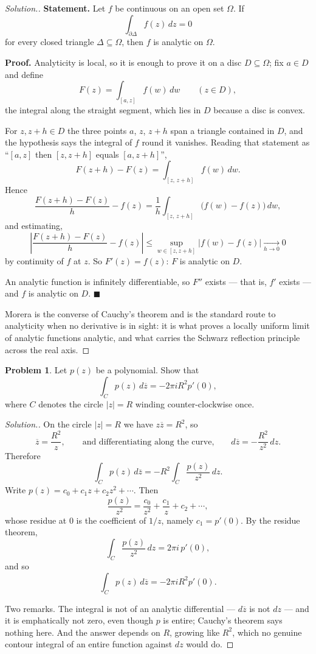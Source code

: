 \documentclass[11pt,a4paper]{article}
\theoremstyle{definition}
\newtheorem{problemx}{Problem}[section]
\newenvironment{problem}{\begin{problemx}}{\end{problemx}}
\newenvironment{solution}
  {\renewcommand{\qedsymbol}{}\begin{proof}[\textit{Solution}.]}
  {\end{proof}}
\begin{document}
\begin{solution}
\textbf{Statement.} Let $f$ be continuous on an open set $\Omega$. If
$$\int_{\partial \Delta} f(z)\,dz = 0$$
for every closed triangle $\Delta \subseteq \Omega$, then $f$ is analytic on
$\Omega$.

\textbf{Proof.} Analyticity is local, so it is enough to prove it on a disc
$D \subseteq \Omega$; fix $a \in D$ and define
$$F(z) = \int_{[a,z]} f(w)\,dw \qquad (z \in D),$$
the integral along the straight segment, which lies in $D$ because a disc is
convex.

For $z, z+h \in D$ the three points $a$, $z$, $z+h$ span a triangle contained in
$D$, and the hypothesis says the integral of $f$ round it vanishes. Reading that
statement as ``$[a,z]$ then $[z,z+h]$ equals $[a,z+h]$'',
$$F(z+h) - F(z) = \int_{[z,\,z+h]} f(w)\,dw .$$
Hence
$$\frac{F(z+h)-F(z)}{h} - f(z)
= \frac{1}{h}\int_{[z,\,z+h]}\big(f(w) - f(z)\big)\,dw,$$
and estimating,
$$\left|\frac{F(z+h)-F(z)}{h} - f(z)\right|
\leq \sup_{w \in [z,z+h]}\left|f(w)-f(z)\right| \xrightarrow[h \to 0]{} 0$$
by continuity of $f$ at $z$. So $F'(z) = f(z)$: $F$ is analytic on $D$.

An analytic function is infinitely differentiable, so $F'' $ exists --- that is,
$f' $ exists --- and $f$ is analytic on $D$. $\blacksquare$

Morera is the converse of Cauchy's theorem and is the standard route to
analyticity when no derivative is in sight: it is what proves a locally uniform
limit of analytic functions analytic, and what carries the Schwarz reflection
principle across the real axis.
\end{solution}


\begin{problem}
Let $p(z)$ be a polynomial. Show that
$$\int_{C} p(z)\,d\overline{z} = -2\pi i R^{2}p'(0),$$
where $C$ denotes the circle $\left|z\right| = R$ winding counter-clockwise
once.
\end{problem}

\begin{solution}
On the circle $\left|z\right| = R$ we have $z\overline{z} = R^{2}$, so
$$\overline{z} = \frac{R^{2}}{z},
\qquad\text{and differentiating along the curve,}\qquad
d\overline{z} = -\frac{R^{2}}{z^{2}}\,dz .$$
Therefore
$$\int_{C} p(z)\,d\overline{z} = -R^{2}\int_{C}\frac{p(z)}{z^{2}}\,dz .$$
Write $p(z) = c_0 + c_1 z + c_2 z^{2} + \cdots$. Then
$$\frac{p(z)}{z^{2}} = \frac{c_0}{z^{2}} + \frac{c_1}{z} + c_2 + \cdots,$$
whose residue at $0$ is the coefficient of $1/z$, namely $c_1 = p'(0)$. By the
residue theorem,
$$\int_{C}\frac{p(z)}{z^{2}}\,dz = 2\pi i\, p'(0),$$
and so
$$\boxed{\int_{C} p(z)\,d\overline{z} = -2\pi i R^{2} p'(0).}$$

Two remarks. The integral is not of an analytic differential --- $d\overline{z}$ is
not $dz$ --- and it is emphatically not zero, even though $p$ is entire; Cauchy's
theorem says nothing here. And the answer depends on $R$, growing like $R^{2}$,
which no genuine contour integral of an entire function against $dz$ would do.
\end{solution}
\end{document}

